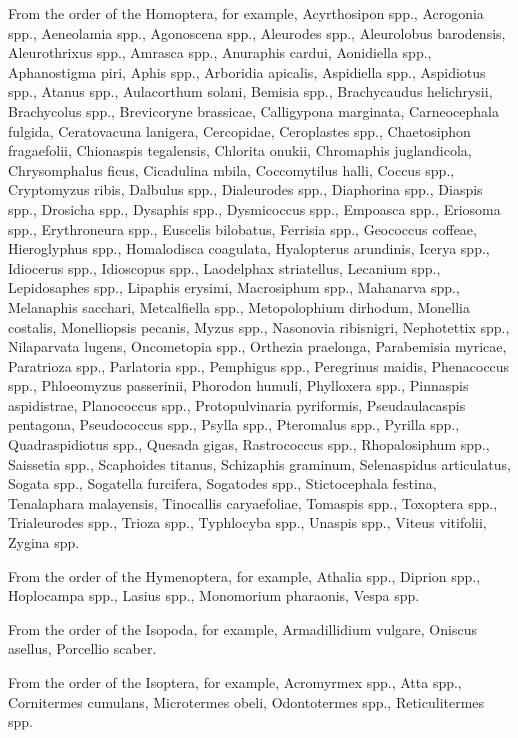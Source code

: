 \documentclass[11pt,a4paper]{article}
\begin{document}
From the order of the Homoptera, for example, Acyrthosipon spp., Acrogonia spp., Aeneolamia spp., Agonoscena spp., Aleurodes spp., Aleurolobus barodensis, Aleurothrixus spp., Amrasca spp., Anuraphis cardui, Aonidiella spp., Aphanostigma piri, Aphis spp., Arboridia apicalis, Aspidiella spp., Aspidiotus spp., Atanus spp., Aulacorthum solani, Bemisia spp., Brachycaudus helichrysii, Brachycolus spp., Brevicoryne brassicae, Calligypona marginata, Carneocephala fulgida, Ceratovacuna lanigera, Cercopidae, Ceroplastes spp., Chaetosiphon fragaefolii, Chionaspis tegalensis, Chlorita onukii, Chromaphis juglandicola, Chrysomphalus ficus, Cicadulina mbila, Coccomytilus halli, Coccus spp., Cryptomyzus ribis, Dalbulus spp., Dialeurodes spp., Diaphorina spp., Diaspis spp., Drosicha spp., Dysaphis spp., Dysmicoccus spp., Empoasca spp., Eriosoma spp., Erythroneura spp., Euscelis bilobatus, Ferrisia spp., Geococcus coffeae, Hieroglyphus spp., Homalodisca coagulata, Hyalopterus arundinis, Icerya spp., Idiocerus spp., Idioscopus spp., Laodelphax striatellus, Lecanium spp., Lepidosaphes spp., Lipaphis erysimi, Macrosiphum spp., Mahanarva spp., Melanaphis sacchari, Metcalfiella spp., Metopolophium dirhodum, Monellia costalis, Monelliopsis pecanis, Myzus spp., Nasonovia ribisnigri, Nephotettix spp., Nilaparvata lugens, Oncometopia spp., Orthezia praelonga, Parabemisia myricae, Paratrioza spp., Parlatoria spp., Pemphigus spp., Peregrinus maidis, Phenacoccus spp., Phloeomyzus passerinii, Phorodon humuli, Phylloxera spp., Pinnaspis aspidistrae, Planococcus spp., Protopulvinaria pyriformis, Pseudaulacaspis pentagona, Pseudococcus spp., Psylla spp., Pteromalus spp., Pyrilla spp., Quadraspidiotus spp., Quesada gigas, Rastrococcus spp., Rhopalosiphum spp., Saissetia spp., Scaphoides titanus, Schizaphis graminum, Selenaspidus articulatus, Sogata spp., Sogatella furcifera, Sogatodes spp., Stictocephala festina, Tenalaphara malayensis, Tinocallis caryaefoliae, Tomaspis spp., Toxoptera spp., Trialeurodes spp., Trioza spp., Typhlocyba spp., Unaspis spp., Viteus vitifolii, Zygina spp.

From the order of the Hymenoptera, for example, Athalia spp., Diprion spp., Hoplocampa spp., Lasius spp., Monomorium pharaonis, Vespa spp.

From the order of the Isopoda, for example, Armadillidium vulgare, Oniscus asellus, Porcellio scaber.

From the order of the Isoptera, for example, Acromyrmex spp., Atta spp., Cornitermes cumulans, Microtermes obeli, Odontotermes spp., Reticulitermes spp.
\end{document}
